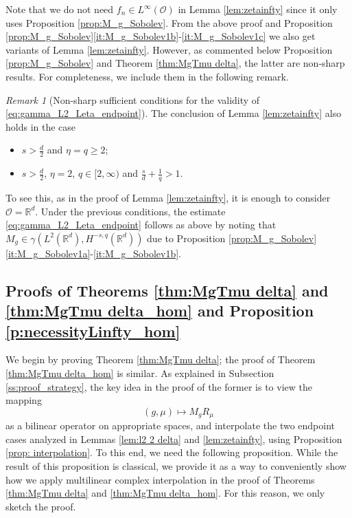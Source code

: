 \documentclass[reqno]{amsart}
\theoremstyle{plain}
\theoremstyle{remark}
\newtheorem{remark}[theorem]{Remark}
\theoremstyle{plain}
\numberwithin{equation}{section}
\newcommand\cO{\mathcal{O}}
\def\R{{\mathbb R}}
\newcommand{\g}{\gamma}
\newcommand{\Domm}{\mathcal{O}}
\newcommand{\1}{\one}
\begin{document}
Note that we do not need $f_n\in L^\infty(\cO)$ in Lemma \ref{lem:zetainfty} since it only uses  Proposition \ref{prop:M_g_Sobolev}. 
From the above proof and Proposition \ref{prop:M_g_Sobolev}\eqref{it:M_g_Sobolev1b}-\eqref{it:M_g_Sobolev1c} we also get variants of Lemma \ref{lem:zetainfty}. However, as commented below Proposition \ref{prop:M_g_Sobolev} and Theorem \ref{thm:MgTmu delta}, the latter are non-sharp results. For completeness, we include them in the following remark. 


\begin{remark}[Non-sharp sufficient conditions for the validity of \eqref{eq:gamma_L2_Leta_endpoint}]
\label{rem:zetainfty2}
The conclusion of Lemma \ref{lem:zetainfty} also holds in the case 
\begin{itemize}
\item 
$
s>\frac{d}{2}$ and $\eta=q\geq 2$;
\item 
$s>\frac{d}{2}$, $\eta=2$, $q\in [2,\infty)$ and $\frac{s}{d} + \frac{1}{q} > 1$.
\end{itemize}
To see this, as in the proof of Lemma \ref{lem:zetainfty}, it is enough to consider $\Domm=\R^d$. Under the previous conditions, the estimate \eqref{eq:gamma_L2_Leta_endpoint} follows as above by noting that $M_g \in \g(L^2(\R^d),H^{-s,q}(\R^d))$ due to Proposition \ref{prop:M_g_Sobolev}\eqref{it:M_g_Sobolev1a}-\eqref{it:M_g_Sobolev1b}.
\end{remark}


\subsection{Proofs of Theorems \ref{thm:MgTmu delta} and \ref{thm:MgTmu delta_hom} and Proposition \ref{p:necessityLinfty_hom}}
\label{ss:proof_generalized_growth}
We begin by proving Theorem \ref{thm:MgTmu delta}; the proof of Theorem \ref{thm:MgTmu delta_hom} is similar. 
As explained in Subsection \ref{ss:proof_strategy}, the key idea in the proof of the former is to view the mapping
$$
(g,\mu)\mapsto M_g R_\mu
$$ 
as a bilinear operator on appropriate spaces, and interpolate the two endpoint cases analyzed in Lemmas \ref{lem:l2 2 delta} and \ref{lem:zetainfty}, using Proposition \ref{prop: interpolation}. 
To this end, we need the following proposition. While the result of this proposition is classical, we provide it as a way to conveniently show how we apply multilinear complex interpolation in the proof of Theorems \ref{thm:MgTmu delta} and \ref{thm:MgTmu delta_hom}. For this reason, we only sketch the proof.
\end{document}
